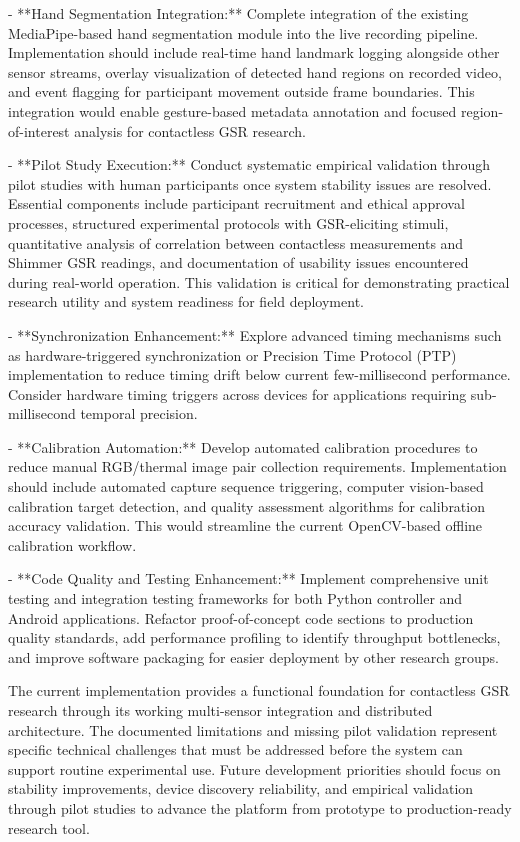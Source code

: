 \documentclass[12pt,a4paper]{article}
\begin{document}
{- **Hand Segmentation Integration:** Complete integration of the existing
  MediaPipe-based hand segmentation module into the live recording
  pipeline. Implementation should include real-time hand landmark logging
  alongside other sensor streams, overlay visualization of detected hand
  regions on recorded video, and event flagging for participant movement
  outside frame boundaries. This integration would enable gesture-based
  metadata annotation and focused region-of-interest analysis for
  contactless GSR research.

- **Pilot Study Execution:** Conduct systematic empirical validation
  through pilot studies with human participants once system stability
  issues are resolved. Essential components include participant recruitment
  and ethical approval processes, structured experimental protocols with
  GSR-eliciting stimuli, quantitative analysis of correlation between
  contactless measurements and Shimmer GSR readings, and documentation
  of usability issues encountered during real-world operation. This
  validation is critical for demonstrating practical research utility
  and system readiness for field deployment.

- **Synchronization Enhancement:** Explore advanced timing mechanisms
  such as hardware-triggered synchronization or Precision Time Protocol
  (PTP) implementation to reduce timing drift below current few-millisecond
  performance. Consider hardware timing triggers across devices for
  applications requiring sub-millisecond temporal precision.

- **Calibration Automation:** Develop automated calibration procedures
  to reduce manual RGB/thermal image pair collection requirements.
  Implementation should include automated capture sequence triggering,
  computer vision-based calibration target detection, and quality
  assessment algorithms for calibration accuracy validation. This would
  streamline the current OpenCV-based offline calibration workflow.

- **Code Quality and Testing Enhancement:** Implement comprehensive
  unit testing and integration testing frameworks for both Python
  controller and Android applications. Refactor proof-of-concept code
  sections to production quality standards, add performance profiling
  to identify throughput bottlenecks, and improve software packaging
  for easier deployment by other research groups.

The current implementation provides a functional foundation for contactless GSR research through its working multi-sensor integration and distributed architecture. The documented limitations and missing pilot validation represent specific technical challenges that must be addressed before the system can support routine experimental use. Future development priorities should focus on stability improvements, device discovery reliability, and empirical validation through pilot studies to advance the platform from prototype to production-ready research tool.

}
\end{document}
